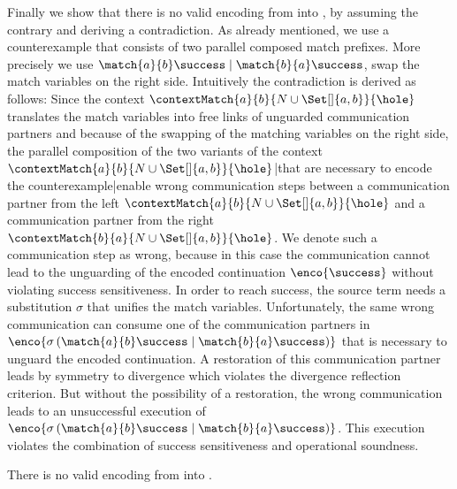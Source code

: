\documentclass[final,copyright,creativecommons]{eptcs}
\begin{document}
Finally we show that there is no valid encoding from \piT into \piNM, by assuming the contrary and deriving a contradiction. As already mentioned, we use a counterexample that consists of two parallel composed match prefixes. More precisely we use $ \match{a}{b}\success \mid \match{b}{a}\success $, \ie swap the match variables on the right side. Intuitively the contradiction is derived as follows: Since the context $ \contextMatch{a}{b}{N \cup \Set[]{ a, b }}{\hole} $ translates the match variables into free links of unguarded communication partners and because of the swapping of the matching variables on the right side, the parallel composition of the two variants of the context $ \contextMatch{a}{b}{N \cup \Set[]{ a, b }}{\hole} $|that are necessary to encode the counterexample|enable wrong communication steps between a communication partner from the left $ \contextMatch{a}{b}{N \cup \Set[]{ a, b }}{\hole} $ and a communication partner from the right $ \contextMatch{b}{a}{N \cup \Set[]{ a, b }}{\hole} $. We denote such a communication step as wrong, because in this case the communication cannot lead to the unguarding of the encoded continuation $ \enco{\success} $ without violating success sensitiveness. In order to reach success, the source term needs a substitution $ \sigma $ that unifies the match variables. Unfortunately, the same wrong communication can consume one of the communication partners in $ \enco{\sigma\left( \match{a}{b}\success \mid \match{b}{a}\success \right)} $ that is necessary to unguard the encoded continuation. A restoration of this communication partner leads by symmetry to divergence which violates the divergence reflection criterion. But without the possibility of a restoration, the wrong communication leads to an unsuccessful execution of $ \enco{\sigma\left( \match{a}{b}\success \mid \match{b}{a}\success \right)} $. This execution violates the combination of success sensitiveness and operational soundness.

\begin{theorem}
	\label{thm:noEnc}
	There is no valid encoding from \piT into \piNM.
\end{theorem}
\end{document}
